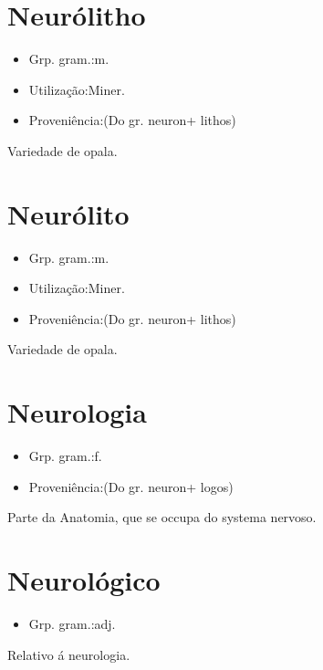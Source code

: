 \section{Neurólitho}
\begin{itemize}
\item {Grp. gram.:m.}
\end{itemize}
\begin{itemize}
\item {Utilização:Miner.}
\end{itemize}
\begin{itemize}
\item {Proveniência:(Do gr. \textunderscore neuron\textunderscore  + \textunderscore lithos\textunderscore )}
\end{itemize}
Variedade de opala.
\section{Neurólito}
\begin{itemize}
\item {Grp. gram.:m.}
\end{itemize}
\begin{itemize}
\item {Utilização:Miner.}
\end{itemize}
\begin{itemize}
\item {Proveniência:(Do gr. \textunderscore neuron\textunderscore  + \textunderscore lithos\textunderscore )}
\end{itemize}
Variedade de opala.
\section{Neurologia}
\begin{itemize}
\item {Grp. gram.:f.}
\end{itemize}
\begin{itemize}
\item {Proveniência:(Do gr. \textunderscore neuron\textunderscore  + \textunderscore logos\textunderscore )}
\end{itemize}
Parte da Anatomia, que se occupa do systema nervoso.
\section{Neurológico}
\begin{itemize}
\item {Grp. gram.:adj.}
\end{itemize}
Relativo á neurologia.
